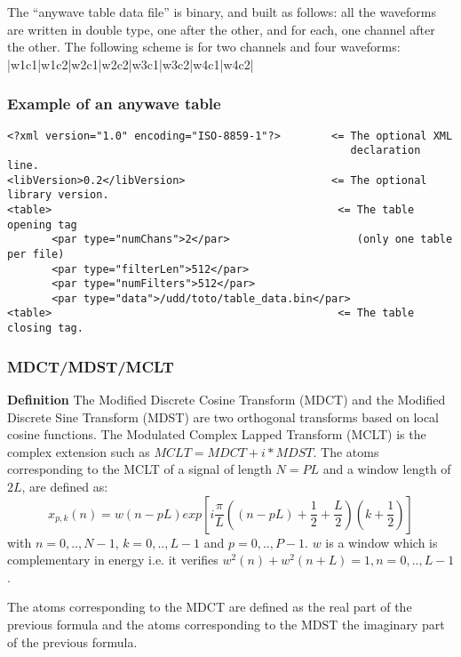 \documentclass[11pt,a4paper]{article}
\begin{document}
The ``anywave table data file'' is binary, and built as follows: all the
waveforms are written in double type, one after the other, and for each, one
channel after the other. The following scheme is for two channels and four
waveforms: {\center |w1c1|w1c2|w2c1|w2c2|w3c1|w3c2|w4c1|w4c2| }

\subsubsection*{Example of an anywave table}
\begin{verbatim}
<?xml version="1.0" encoding="ISO-8859-1"?>        <= The optional XML
                                                      declaration line.
<libVersion>0.2</libVersion>                       <= The optional library version.
<table>                                             <= The table opening tag
       <par type="numChans">2</par>                    (only one table per file)
       <par type="filterLen">512</par>
       <par type="numFilters">512</par>
       <par type="data">/udd/toto/table_data.bin</par>
<table>                                             <= The table closing tag.
\end{verbatim}

\subsubsection*{MDCT/MDST/MCLT}

\textbf{Definition} The Modified Discrete Cosine Transform (MDCT) and the Modified Discrete Sine Transform (MDST) are two orthogonal transforms based on local cosine functions. The Modulated Complex Lapped Transform (MCLT) is the complex extension such as $MCLT=MDCT+i*MDST$. The atoms corresponding to the MCLT of a signal of length $N=PL$ and a window length of $2L$, are defined as:
\begin{equation}
x_{p,k}(n) = w(n-pL) exp \left[ i \frac{\pi}{L} \left( (n-pL) + \frac{1}{2} + \frac{L}{2} \right) \left( k + \frac{1}{2} \right) \right]
\end{equation} 
with $n=0,..,N-1$, $k=0,..,L-1$ and $p=0,..,P-1$. $w$ is a window which is complementary in energy i.e. it verifies $w^2 (n) + w^2 (n+L) = 1, n=0,..,L-1$.

The atoms corresponding to the MDCT are defined as the real part of the previous formula and the atoms corresponding to the MDST the imaginary part of the previous formula.
\end{document}
